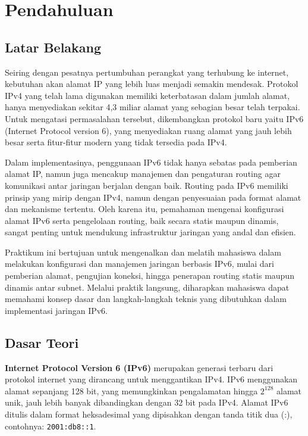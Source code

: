 \section{Pendahuluan}
\subsection*{Latar Belakang}

Seiring dengan pesatnya pertumbuhan perangkat yang terhubung ke internet, kebutuhan akan alamat IP yang lebih luas menjadi semakin mendesak. Protokol IPv4 yang telah lama digunakan memiliki keterbatasan dalam jumlah alamat, hanya menyediakan sekitar 4,3 miliar alamat yang sebagian besar telah terpakai. Untuk mengatasi permasalahan tersebut, dikembangkan protokol baru yaitu IPv6 (Internet Protocol version 6), yang menyediakan ruang alamat yang jauh lebih besar serta fitur-fitur modern yang tidak tersedia pada IPv4.

Dalam implementasinya, penggunaan IPv6 tidak hanya sebatas pada pemberian alamat IP, namun juga mencakup manajemen dan pengaturan routing agar komunikasi antar jaringan berjalan dengan baik. Routing pada IPv6 memiliki prinsip yang mirip dengan IPv4, namun dengan penyesuaian pada format alamat dan mekanisme tertentu. Oleh karena itu, pemahaman mengenai konfigurasi alamat IPv6 serta pengelolaan routing, baik secara statis maupun dinamis, sangat penting untuk mendukung infrastruktur jaringan yang andal dan efisien.

Praktikum ini bertujuan untuk mengenalkan dan melatih mahasiswa dalam melakukan konfigurasi dan manajemen jaringan berbasis IPv6, mulai dari pemberian alamat, pengujian koneksi, hingga penerapan routing statis maupun dinamis antar subnet. Melalui praktik langsung, diharapkan mahasiswa dapat memahami konsep dasar dan langkah-langkah teknis yang dibutuhkan dalam implementasi jaringan IPv6.

\subsection*{Dasar Teori}

\textbf{Internet Protocol Version 6 (IPv6)} merupakan generasi terbaru dari protokol internet yang dirancang untuk menggantikan IPv4. IPv6 menggunakan alamat sepanjang 128 bit, yang memungkinkan pengalamatan hingga $2^{128}$ alamat unik, jauh lebih banyak dibandingkan dengan 32 bit pada IPv4. Alamat IPv6 ditulis dalam format heksadesimal yang dipisahkan dengan tanda titik dua (:), contohnya: \texttt{2001:db8::1}.

